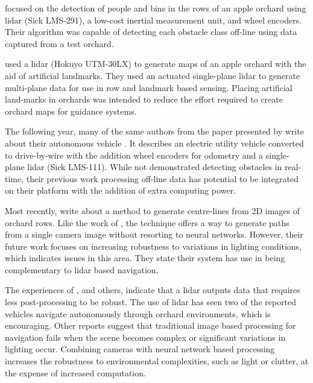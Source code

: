 \documentclass[preprint,authoryear,12pt]{elsarticle}
\begin{document}
        \cite{Freitas2012} focused on the detection of people and bins in the rows of an apple orchard using lidar (Sick LMS-291), a low-cost inertial measurement unit, and wheel encoders.
        Their algorithm was capable of detecting each obstacle class off-line using data captured from a test orchard.

        \cite{Zhang2014} used a lidar (Hokuyo UTM-30LX) to generate maps of an apple orchard with the aid of artificial landmarks.
        They used an actuated single-plane lidar to generate multi-plane data for use in row and landmark based sensing.
        Placing artificial land-marks in orchards was intended to reduce the effort required to create orchard maps for guidance systems.

        The following year, many of the same authors from  the paper presented by \cite{Zhang2014} write about their autonomous vehicle \citep{Bergerman2015}.
        It describes an electric utility vehicle converted to drive-by-wire with the addition wheel encoders for odometry and a single-plane lidar (Sick LMS-111).
        While not demonstrated detecting obstacles in real-time, their previous work processing off-line data \citep{Freitas2012} has potential to be integrated on their platform with the addition of extra computing power.

        Most recently, \cite{Sharifi2015} write about a method to generate centre-lines from 2D images of orchard rows.
        Like the work of \cite{He2011}, the technique offers a way to generate paths from a single camera image without resorting to neural networks.
        However, their future work focuses on increasing robustness to variations in lighting conditions, which indicates issues in this area.
        They state their system has use in being complementary to lidar based navigation.

        The experiences of \cite{Scarfe2012}, and others, indicate that a lidar outputs data that requires less post-processing to be robust.
        The use of lidar has seen two of the reported vehicles navigate autonomously through orchard environments, which is encouraging.
        Other reports suggest that traditional image based processing for navigation fails when the scene becomes complex or significant variations in lighting occur.
        Combining cameras with neural network based processing increases the robustness to environmental complexities, such as light or clutter, at the expense of increased computation.
\end{document}
